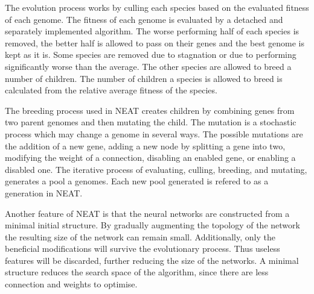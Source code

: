 The evolution process works by culling each species based on the evaluated fitness of each genome. The fitness of each genome is evaluated by a detached and separately implemented algorithm. The worse performing half of each species is removed, the better half is allowed to pass on their genes and the best genome is kept as it is. Some species are removed due to stagnation or due to performing significantly worse than the average. The other species are allowed to breed a number of children. The number of children a species is allowed to breed is calculated from the relative average fitness of the species. 

The breeding process used in NEAT creates children by combining genes from two parent genomes and then mutating the child. The mutation is a stochastic process which may change a genome in several ways. The possible mutations are the addition of a new gene, adding a new node by splitting a gene into two, modifying the weight of a connection, disabling an enabled gene, or enabling a disabled one. The iterative process of evaluating, culling, breeding, and mutating, generates a pool a genomes. Each new pool generated is refered to as a generation in NEAT.

Another feature of NEAT is that the neural networks are constructed from a minimal initial structure. By gradually augmenting the topology of the network the resulting size of the network can remain small. Additionally, only the beneficial modifications will survive the evolutionary process. Thus useless features will be discarded, further reducing the size of the networks. A minimal structure reduces the search space of the algorithm, since there are less connection and weights to optimise. 
